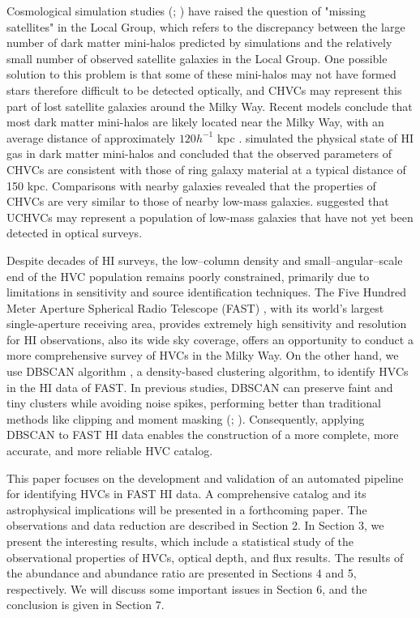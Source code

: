 \documentclass[twocolumn,trackchanges]{aastex701}
\begin{document}
Cosmological simulation studies (\citealt{1999ApJ...522...82K}; \citealt{1999ApJ...524L..19M}) have raised the question of "missing satellites" in the Local Group, which refers to the discrepancy between the large number of dark matter mini-halos predicted by simulations and the relatively small number of observed satellite galaxies in the Local Group. One possible solution to this problem is that some of these mini-halos may not have formed stars therefore difficult to be detected optically, and CHVCs may represent this part of lost satellite galaxies around the Milky Way. Recent models conclude that most dark matter mini-halos are likely located near the Milky Way, with an average distance of approximately $120h^{-1}$ kpc \citep{2004ApJ...609..482K}. \citet{2002ApJS..143..419S} simulated the physical state of HI gas in dark matter mini-halos and concluded that the observed parameters of CHVCs are consistent with those of ring galaxy material at a typical distance of 150 kpc. Comparisons with nearby galaxies revealed that the properties of CHVCs are very similar to those of nearby low-mass galaxies. \citet{2013ApJ...768...77A} suggested that UCHVCs may represent a population of low-mass galaxies that have not yet been detected in optical surveys.

Despite decades of HI surveys, the low–column density and small–angular–scale end of the HVC population remains poorly constrained, primarily due to limitations in sensitivity and source identification techniques. The Five Hundred Meter Aperture Spherical Radio Telescope (FAST) \citep{2011IJMPD..20..989N}, with its world's largest single-aperture receiving area, provides extremely high sensitivity and resolution  for HI observations, also its wide sky coverage, offers an opportunity to conduct a more comprehensive survey of HVCs in the Milky Way. On the other hand, we use DBSCAN algorithm \citep{1996kddm.conf..226E}, a density-based clustering algorithm, to identify HVCs in the HI data of FAST. In previous studies, DBSCAN can preserve faint and tiny clusters while avoiding noise spikes, performing better than traditional methods like clipping and moment masking (\citealt{2020ApJ...898...80Y}; \citealt{2022ApJS..261...37Y}). Consequently, applying DBSCAN to FAST HI data enables the construction of a more complete, more accurate, and more reliable HVC catalog.

This paper focuses on the development and validation of an automated pipeline for identifying HVCs in FAST HI data. A comprehensive catalog and its astrophysical implications will be presented in a forthcoming paper. The observations and data reduction are described in Section 2. In Section 3, we present the interesting results, which include a statistical study of the observational properties of HVCs, optical depth, and flux results. The results of the abundance and abundance ratio are presented in Sections 4 and 5, respectively. We will discuss some important issues in Section 6, and the conclusion is given in Section 7.
\end{document}
